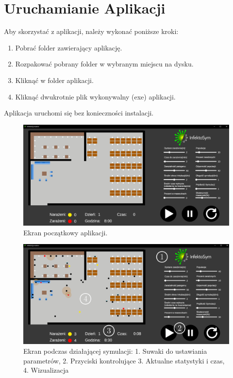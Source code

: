 \section{Uruchamianie Aplikacji}

Aby skorzystać z aplikacji, należy wykonać poniższe kroki:

\begin{enumerate}
	\item Pobrać folder zawierający aplikację.
	\item Rozpakować pobrany folder w wybranym miejscu na dysku.
	\item Kliknąć w folder aplikacji.
	\item Kliknąć dwukrotnie plik wykonywalny (exe) aplikacji.
\end{enumerate}

Aplikacja uruchomi się bez konieczności instalacji.

\begin{figure}[h!]
	\includegraphics[width=\linewidth]{beforeSim.png}
	\caption{Ekran początkowy aplikacji.}
\end{figure}

\begin{figure}[h!]
	\includegraphics[width=\linewidth]{runningSimwithNumbers.png}
	\caption{Ekran podczas działającej symulacji: 1. Suwaki do ustawiania parametrów, 2. Przyciski kontrolujące 3. Aktualne statystyki i czas, 4. Wizualizacja}
\end{figure}

